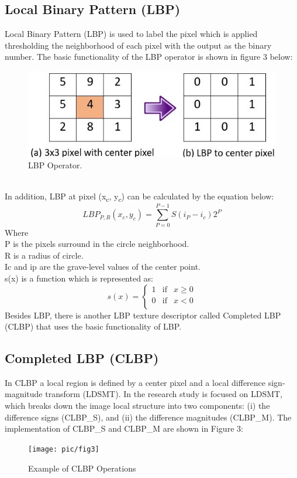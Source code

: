 \documentclass[review]{elsarticle}
\begin{document}
\subsection{Local Binary Pattern (LBP)} 
Local Binary Pattern (LBP) \cite{Ojala1996} is used to label the pixel which is applied thresholding the neighborhood of each pixel with the output as the binary number. The basic functionality of the LBP operator is shown in figure 3 below: 
\begin{figure}[h]
	\centering
	\includegraphics[width=0.5\linewidth]{pic/fig2}
	\caption{LBP Operator.}
	\label{fig:fig2}
\end{figure}\\
In addition, LBP at pixel (x\textsubscript{c}, y\textsubscript{c}) can be calculated by the equation below: 
\begin{equation}
LBP_{P,R} (x_c,y_c) = \sum_{P=0}^{P-1} S(i_P - i_c)2^P
\end{equation}
Where \\ 
P is the pixels surround in the circle neighborhood. \\
R is a radius of circle. \\
Ic  and ip are the grave-level values of the center point. \\
s(x) is a function which is represented as: \\
\begin{equation}
s(x) = \left\{ \begin{array}{rcl}
1 & \mbox{if}
& x\geq0 \\ 0 & \mbox{if} & x <0 \\

\end{array}\right.
\end{equation}
Besides LBP, there is another LBP texture descriptor called Completed LBP (CLBP) that uses the basic functionality of LBP.

\subsection{ Completed LBP (CLBP)} 

In CLBP \cite{Guo2010} a local region is defined by a center pixel and a local difference sign-magnitude transform (LDSMT). In the research study is focused on LDSMT, which breaks down the image local structure into two components: (i) the difference signs (CLBP\_S), and (ii) the difference magnitudes (CLBP\_M). The implementation of CLBP\_S and CLBP\_M are shown in Figure 3:\\
\begin{figure}[h!]
	\centering
	\texttt{[image: pic/fig3]}
	\caption{Example of CLBP Operations}
	\label{fig:fig3}
\end{figure}
\end{document}
